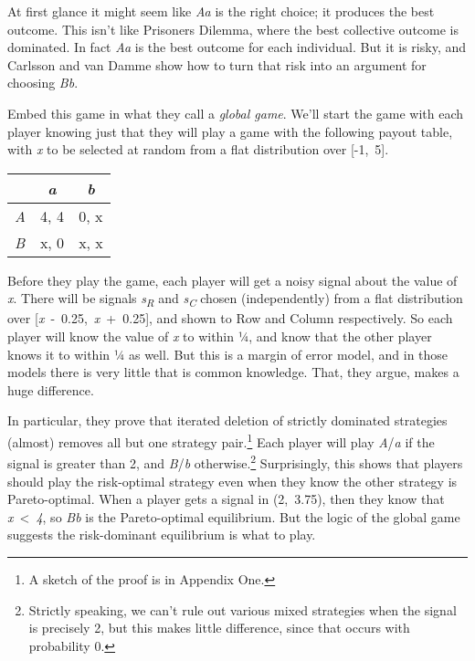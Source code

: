 \documentclass[
  11pt,
  letterpaper,
  DIV=11,
  numbers=noendperiod,
  twoside]{scrartcl}
\begin{document}
At first glance it might seem like \emph{Aa} is the right choice; it
produces the best outcome. This isn't like Prisoners Dilemma, where the
best collective outcome is dominated. In fact \emph{Aa} is the best
outcome for each individual. But it is risky, and Carlsson and van Damme
show how to turn that risk into an argument for choosing \emph{Bb}.

Embed this game in what they call a \emph{global game}. We'll start the
game with each player knowing just that they will play a game with the
following payout table, with \emph{x} to be selected at random from a
flat distribution over {[}-1,~5{]}.

\begin{longtable}[]{@{}lcc@{}}
\toprule\noalign{}
& \emph{a} & \emph{b} \\
\midrule\noalign{}
\endhead
\bottomrule\noalign{}
\endlastfoot
\emph{A} & 4, 4 & 0, x \\
\emph{B} & x, 0 & x, x \\
\end{longtable}

Before they play the game, each player will get a noisy signal about the
value of \emph{x}. There will be signals \emph{s\textsubscript{R}} and
\emph{s\textsubscript{C}} chosen (independently) from a flat
distribution over {[}\emph{x}~-~0.25,~\emph{x}~+~0.25{]}, and shown to
Row and Column respectively. So each player will know the value of
\emph{x} to within ¼, and know that the other player knows it to within
¼ as well. But this is a margin of error model, and in those models
there is very little that is common knowledge. That, they argue, makes a
huge difference.

In particular, they prove that iterated deletion of strictly dominated
strategies (almost) removes all but one strategy pair.\footnote{A sketch
  of the proof is in Appendix One.} Each player will play
\emph{A}/\emph{a} if the signal is greater than 2, and \emph{B}/\emph{b}
otherwise.\footnote{Strictly speaking, we can't rule out various mixed
  strategies when the signal is precisely 2, but this makes little
  difference, since that occurs with probability 0.} Surprisingly, this
shows that players should play the risk-optimal strategy even when they
know the other strategy is Pareto-optimal. When a player gets a signal
in (2,~3.75), then they know that \emph{x}~\textless~\emph{4}, so
\emph{Bb} is the Pareto-optimal equilibrium. But the logic of the global
game suggests the risk-dominant equilibrium is what to play.
\end{document}
